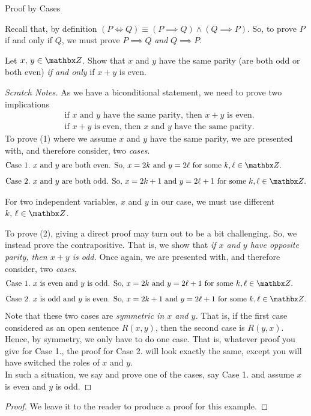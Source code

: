 
\begin{mdframed}
\begin{center}
{\Large Proof by Cases}
\end{center}
\end{mdframed}
Recall that, by definition $(P \iff Q) \equiv (P \implies Q) \land (Q \implies P)$. So, to prove $P$ if and only if $Q$, we must prove $P \implies Q$ \emph{and} $Q \implies P$. 

\vspace*{1em}

\begin{example}
Let $x,\,y \in \zz$. Show that $x$ and $y$ have the same parity (are both odd or both even) \emph{if and only} if $x + y$ is even.
\end{example}
\begin{proof}[Scratch Notes]
\renewcommand{\qedsymbol}{}
As we have a biconditional statement, we need to prove two implications
\begin{align*}
&\text{if $x$ and $y$ have the same parity, then $x + y$ is even.} \tag{1}\\[0.5em]
&\text{if $x+y$ is even, then $x$ and $y$ have the same parity.} \tag{2}
\end{align*}
To prove (1) where we assume $x$ and $y$ have the same parity, we are presented with, and therefore consider, two \emph{cases}.
\begin{align*}
\text{Case 1}.&\ \text{$x$ and $y$ are both even. So, $x = 2k$ and $y = 2\ell$ for some $k,\ell \in \zz$.}\\[0.5em]
\text{Case 2}.&\ \text{$x$ and $y$ are both odd. So, $x = 2k + 1$ and $y = 2\ell + 1$ for some $k,\ell \in \zz$.}
\end{align*}
\begin{dangerbend}
For two independent variables, $x$ and $y$ in our case, we must use different $k,\,\ell \in \zz$.
\end{dangerbend}
To prove (2), giving a direct proof may turn out to be a bit challenging. So, we instead prove the contrapositive. That is, we show that \emph{if $x$ and $y$ have opposite parity, then $x + y$ is odd.} Once again, we are presented with, and therefore consider, two \emph{cases}.
\begin{align*}
\text{Case 1}.&\ \text{$x$ is even and $y$ is odd. So, $x = 2k$ and $y = 2\ell + 1$ for some $k,\ell \in \zz$.}\\[0.5em]
\text{Case 2}.&\ \text{$x$ is odd and $y$ is even. So, $x = 2k + 1$ and $y = 2\ell + 1$ for some $k,\ell \in \zz$.}
\end{align*}
Note that these two cases are \emph{symmetric in $x$ and $y$.} That is, if the first case considered as an open sentence $R(x,y)$, then the second case is $R(y,x)$. Hence, by symmetry, we only have to do one case. That is, whatever proof you give for Case 1., the proof for Case 2. will look exactly the same, except you will have switched the roles of $x$ and $y$.\\[0.5em]
In such a situation, we say  and prove one of the cases, say Case 1. and assume $x$ is even and $y$ is odd. 
\end{proof}
\begin{proof}
We leave it to the reader to produce a proof for this example.
\end{proof}